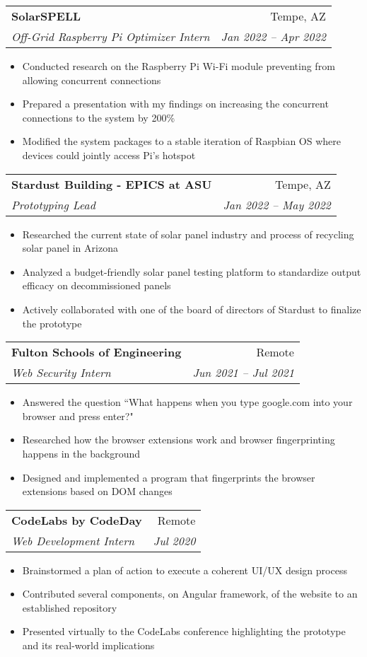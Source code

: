 \documentclass[letterpaper,11pt]{article}
\makeatletter
\newcommand{\resumeItem}[1]{
  \item\small{
    {#1 \vspace{-2pt}}
  }
}
\newcommand{\resumeSubheading}[4]{
  \vspace{-2pt}\item
    \begin{tabular*}{0.97\textwidth}[t]{l@{\extracolsep{\fill}}r}
      \textbf{#1} & #2 \\
      \textit{\small#3} & \textit{\small #4} \\
    \end{tabular*}\vspace{-7pt}
}
\newcommand{\resumeSubSubheading}[2]{
    \item
    \begin{tabular*}{0.97\textwidth}{l@{\extracolsep{\fill}}r}
      \textit{\small#1} & \textit{\small #2} \\
    \end{tabular*}\vspace{-7pt}
}
\newcommand{\resumeSubHeadingListEnd}{\end{itemize}}
\newcommand{\resumeItemListStart}{\begin{itemize}}
\newcommand{\resumeItemListEnd}{\end{itemize}\vspace{-5pt}}
\makeatother
\begin{document}

\resumeSubheading
{SolarSPELL}{Tempe, AZ}
{Off-Grid Raspberry Pi Optimizer Intern}{Jan 2022 -- Apr 2022}
\resumeItemListStart
\resumeItem{Conducted research on the Raspberry Pi Wi-Fi module preventing from allowing concurrent connections}
\resumeItem{Prepared a presentation with my findings on increasing the concurrent connections to the system by 200\%}
\resumeItem{Modified the system packages to a stable iteration of Raspbian OS where devices could jointly access Pi's hotspot}
\resumeItemListEnd

\resumeSubheading
{Stardust Building - EPICS at ASU}{Tempe, AZ}
{Prototyping Lead}{Jan 2022 -- May 2022}
\resumeItemListStart
\resumeItem{Researched the current state of solar panel industry and process of recycling solar panel in Arizona}
\resumeItem{Analyzed a budget-friendly solar panel testing platform to standardize output efficacy on decommissioned panels}
\resumeItem{Actively collaborated with one of the board of directors of Stardust to finalize the prototype}
\resumeItemListEnd


\resumeSubheading
{Fulton Schools of Engineering}{Remote}
{Web Security Intern}{Jun 2021 -- Jul 2021}
\resumeItemListStart
\resumeItem{Answered the question ``What happens when you type google.com into your browser and press enter?"}
\resumeItem{Researched how the browser extensions work and browser fingerprinting happens in the background}
\resumeItem{Designed and implemented a program that fingerprints the browser extensions based on DOM changes}
\resumeItemListEnd

\resumeSubheading
{CodeLabs by CodeDay}{Remote}
{Web Development Intern}{Jul 2020}
\resumeItemListStart
\resumeItem{Brainstormed a plan of action to execute a coherent UI/UX design process}
\resumeItem{Contributed several components, on Angular framework, of the website to an established repository}
\resumeItem{Presented virtually to the CodeLabs conference highlighting the prototype and its real-world implications}
\resumeItemListEnd
\end{document}
